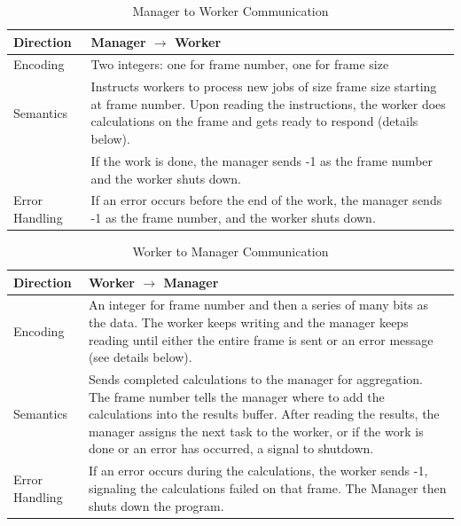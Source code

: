 \documentclass[11pt]{extarticle}
\begin{document}
\begin{table}[ht!]
\caption{Manager to Worker Communication}
\label{t:MW}
\centering
\begin{tabular}{|l|p{14cm}|}
\hline
Direction & Manager $\to$ Worker \\ \hline
Encoding & Two integers: one for frame number, one for frame size \\ \hline
 Semantics & Instructs workers to process new jobs of size frame size starting at frame number. Upon reading the instructions, the worker does calculations on the frame and gets ready to respond (details below). \\
 & If the work is done, the manager sends -1 as the frame number and the worker shuts down.
 \\ \hline
Error Handling & If an error occurs before the end of the work, the manager sends -1 as the frame number, and the worker shuts down. \\ \hline
\end{tabular}
\end{table}

\begin{table}[ht!]
\caption{Worker to Manager Communication}
\label{t:WM}
\centering
\begin{tabular}{|l|p{14cm}|}
\hline
Direction & Worker $\to$ Manager \\ \hline
Encoding & An integer for frame number and then a series of many bits as the data. The worker keeps writing and the manager keeps reading until either the entire frame is sent or an error message (see details below). \\ \hline
Semantics & Sends completed calculations to the manager for aggregation. The frame number tells the manager where to add the calculations into the results buffer. After reading the results, the manager assigns the next task to the worker, or if the work is done or an error has occurred, a signal to shutdown. \\ \hline
Error Handling & If an error occurs during the calculations, the worker sends -1, signaling the calculations failed on that frame. The Manager then shuts down the program. \\ \hline
\end{tabular}
\end{table}
\end{document}
